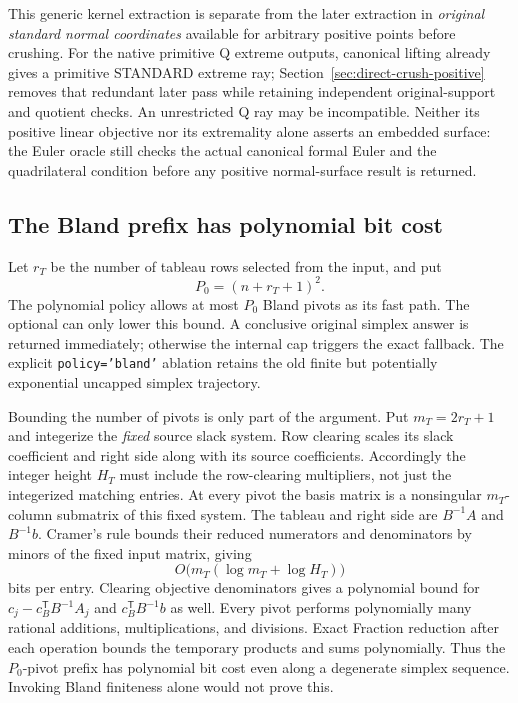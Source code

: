 This generic kernel extraction is separate from the later extraction in
\emph{original standard normal coordinates} available for arbitrary positive
points before crushing.  For the native primitive Q extreme outputs,
canonical lifting already gives a primitive STANDARD extreme ray;
Section~\ref{sec:direct-crush-positive} removes that redundant later pass
while retaining independent original-support and quotient checks.  An
unrestricted Q ray may be incompatible.  Neither its positive linear
objective nor its extremality alone asserts an embedded surface: the Euler
oracle still checks the actual canonical formal Euler and the quadrilateral
condition before any positive normal-surface result is returned.

\subsection{The Bland prefix has polynomial bit cost}

Let $r_T$ be the number of tableau rows selected from the input, and put
\[
 P_0=(n+r_T+1)^2.
\]
The polynomial policy allows at most $P_0$ Bland pivots as its fast path.
The optional  can only lower this bound.
A conclusive original simplex answer is returned immediately;
otherwise the internal cap triggers the exact fallback.  The explicit
\texttt{policy='bland'} ablation retains the old finite but potentially
exponential uncapped simplex trajectory.

Bounding the number of pivots is only part of the argument.  Put
$m_T=2r_T+1$ and integerize the \emph{fixed} source slack system.  Row clearing
scales its slack coefficient and right side along with its source
coefficients.  Accordingly the integer height $H_T$ must include the
row-clearing multipliers, not just the integerized matching entries.
At every pivot the basis matrix is a nonsingular $m_T$-column submatrix of
this fixed system.  The tableau and right side are $B^{-1}A$ and $B^{-1}b$.
Cramer's rule bounds their reduced numerators and denominators by minors of
the fixed input matrix, giving
\[
 O\bigl(m_T(\log m_T+\log H_T)\bigr)
\]
bits per entry.  Clearing objective denominators gives a polynomial bound
for $c_j-c_B^{\mathsf T}B^{-1}A_j$ and $c_B^{\mathsf T}B^{-1}b$ as well.
Every pivot performs polynomially many rational additions, multiplications,
and divisions.  Exact Fraction reduction after each operation bounds the
temporary products and sums polynomially.  Thus the $P_0$-pivot prefix has
polynomial bit cost even along a degenerate simplex sequence.  Invoking
Bland finiteness alone would not prove this.

